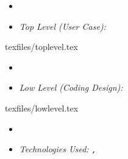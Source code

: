 \clearpage
\begin{itemize}
  \item[] 
  \item[] \textsl{\Large Top Level (User Case):} 
\end{itemize}
{texfiles/toplevel.tex}
\clearpage
\begin{itemize}
  \item[] 
  \item[] \textsl{\Large Low Level (Coding Design):}
\end{itemize}
{texfiles/lowlevel.tex}
\clearpage
\begin{itemize}
  \item[] 
  \item[] \textsl{\Large Technologies Used: \texttt{\normalsize\python, \selenium}}
\end{itemize}
 